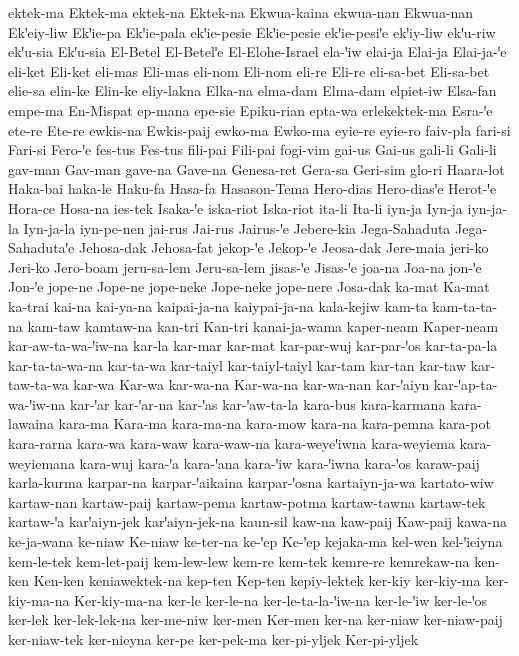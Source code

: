 {ektek-ma
Ektek-ma
ektek-na
Ektek-na
Ekwua-kaina
ekwua-nan
Ekwua-nan
Ekꞌeiy-liw
Ekꞌie-pa
Ekꞌie-pala
ekꞌie-pesie
Ekꞌie-pesie
ekꞌie-pesiꞌe
ekꞌiy-liw
ekꞌu-riw
ekꞌu-sia
Ekꞌu-sia
El-Betel
El-Betelꞌe
El-Elohe-Israel
ela-ꞌiw
elai-ja
Elai-ja
Elai-ja-ꞌe
eli-ket
Eli-ket
eli-mas
Eli-mas
eli-nom
Eli-nom
eli-re
Eli-re
eli-sa-bet
Eli-sa-bet
elie-sa
elin-ke
Elin-ke
eliy-lakna
Elka-na
elma-dam
Elma-dam
elpiet-iw
Elsa-fan
empe-ma
En-Mispat
ep-mana
epe-sie
Epiku-rian
epta-wa
erlekektek-ma
Esra-ꞌe
ete-re
Ete-re
ewkis-na
Ewkis-paij
ewko-ma
Ewko-ma
eyie-re
eyie-ro
faiv-pla
fari-si
Fari-si
Fero-ꞌe
fes-tus
Fes-tus
fili-pai
Fili-pai
fogi-vim
gai-us
Gai-us
gali-li
Gali-li
gav-man
Gav-man
gave-na
Gave-na
Genesa-ret
Gera-sa
Geri-sim
glo-ri
Haara-lot
Haka-bai
haka-le
Haku-fa
Hasa-fa
Hasason-Tema
Hero-dias
Hero-diasꞌe
Herot-ꞌe
Hora-ce
Hosa-na
ies-tek
Isaka-ꞌe
iska-riot
Iska-riot
ita-li
Ita-li
iyn-ja
Iyn-ja
iyn-ja-la
Iyn-ja-la
iyn-pe-nen
jai-rus
Jai-rus
Jairus-ꞌe
Jebere-kia
Jega-Sahaduta
Jega-Sahadutaꞌe
Jehosa-dak
Jehosa-fat
jekop-ꞌe
Jekop-ꞌe
Jeosa-dak
Jere-maia
jeri-ko
Jeri-ko
Jero-boam
jeru-sa-lem
Jeru-sa-lem
jisas-ꞌe
Jisas-ꞌe
joa-na
Joa-na
jon-ꞌe
Jon-ꞌe
jope-ne
Jope-ne
jope-neke
Jope-neke
jope-nere
Josa-dak
ka-mat
Ka-mat
ka-trai
kai-na
kai-ya-na
kaipai-ja-na
kaiypai-ja-na
kala-kejiw
kam-ta
kam-ta-ta-na
kam-taw
kamtaw-na
kan-tri
Kan-tri
kanai-ja-wama
kaper-neam
Kaper-neam
kar-aw-ta-wa-ꞌiw-na
kar-la
kar-mar
kar-mat
kar-par-wuj
kar-par-ꞌos
kar-ta-pa-la
kar-ta-ta-wa-na
kar-ta-wa
kar-taiyl
kar-taiyl-taiyl
kar-tam
kar-tan
kar-taw
kar-taw-ta-wa
kar-wa
Kar-wa
kar-wa-na
Kar-wa-na
kar-wa-nan
kar-ꞌaiyn
kar-ꞌap-ta-wa-ꞌiw-na
kar-ꞌar
kar-ꞌar-na
kar-ꞌas
kar-ꞌaw-ta-la
kara-bus
kara-karmana
kara-lawaina
kara-ma
Kara-ma
kara-ma-na
kara-mow
kara-na
kara-pemna
kara-pot
kara-rarna
kara-wa
kara-waw
kara-waw-na
kara-weyeꞌiwna
kara-weyiema
kara-weyiemana
kara-wuj
kara-ꞌa
kara-ꞌana
kara-ꞌiw
kara-ꞌiwna
kara-ꞌos
karaw-paij
karla-kurma
karpar-na
karpar-ꞌaikaina
karpar-ꞌosna
kartaiyn-ja-wa
kartato-wiw
kartaw-nan
kartaw-paij
kartaw-pema
kartaw-potma
kartaw-tawna
kartaw-tek
kartaw-ꞌa
karꞌaiyn-jek
karꞌaiyn-jek-na
kaun-sil
kaw-na
kaw-paij
Kaw-paij
kawa-na
ke-ja-wana
ke-niaw
Ke-niaw
ke-ter-na
ke-ꞌep
Ke-ꞌep
kejaka-ma
kel-wen
kel-ꞌieiyna
kem-le-tek
kem-let-paij
kem-lew-lew
kem-re
kem-tek
kemre-re
kemrekaw-na
ken-ken
Ken-ken
keniawektek-na
kep-ten
Kep-ten
kepiy-lektek
ker-kiy
ker-kiy-ma
ker-kiy-ma-na
Ker-kiy-ma-na
ker-le
ker-le-na
ker-le-ta-la-ꞌiw-na
ker-le-ꞌiw
ker-le-ꞌos
ker-lek
ker-lek-lek-na
ker-me-niw
ker-men
Ker-men
ker-na
ker-niaw
ker-niaw-paij
ker-niaw-tek
ker-nieyna
ker-pe
ker-pek-ma
ker-pi-yljek
Ker-pi-yljek
}
